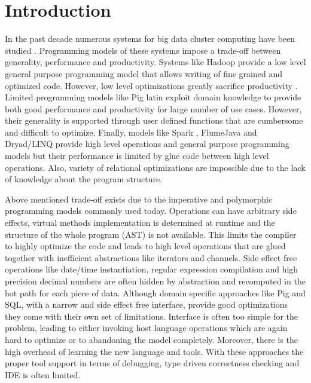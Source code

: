 \section{Introduction}
\label{sec:introduction}

In the past decade numerous systems for big data cluster computing have been studied \cite{dean_mapreduce:_2008, yu_dryadlinq:_2008-1, olston_pig_2008-1, thusoo_hive_2010-1, zaharia_spark:_2010}. Programming models of these systems impose a trade-off between generality, performance and productivity. Systems like Hadoop \cite{_hadoop_????} provide a low level general purpose programming model that allows writing of fine grained and optimized code.  However, low level optimizations greatly sacrifice productivity \cite{chambers_flumejava:_2010}. Limited programming models like Pig latin \cite{olston_pig_2008-1} exploit domain knowledge to provide both good performance and productivity for large number of use cases. However, their generality is supported through user defined functions that are cumbersome and difficult to optimize. Finally, models like Spark \cite{zaharia_spark:_2010}, FlumeJava \cite{chambers_flumejava:_2010} and Dryad/LINQ \cite{yu_dryadlinq:_2008-1} provide high level operations and general purpose programming models but their performance is limited by glue code between high level operations. Also, variety of relational optimizations are impossible due to the lack of knowledge about the program structure. 

Above mentioned trade-off exists due to the imperative and polymorphic programming models commonly used today. Operations can have arbitrary side effects, virtual methods implementation is determined at runtime and the structure of the whole program (AST) is not available. This limits the compiler to highly optimize the code and leads to high level operations that are glued together with inefficient abstractions like iterators and channels. Side effect free operations like date/time instantiation, regular expression compilation and high precision decimal numbers are often hidden by abstraction and recomputed in the hot path for each piece of data. Although domain specific approaches like Pig and SQL, with a narrow and side effect free interface, provide good optimizations they come with their own set of limitations. Interface is often too simple for the problem, leading to either invoking host language operations which are again hard to optimize or to abandoning the model completely. Moreover, there is the high overhead of learning the new language and tools. With these approaches the proper tool support in terms of debugging, type driven correctness checking and IDE is often limited.     


